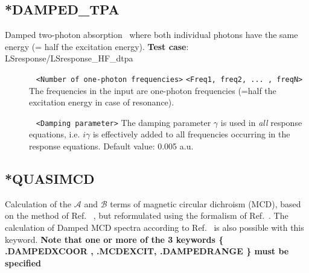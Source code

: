 \subsection{*DAMPED\_TPA}\label{subsec:dtpa}
Damped two-photon absorption~\cite{dampedtpa} where both individual photons
have the same energy (= half the excitation energy).
\newline
{\bf Test case}: LSresponse/LSresponse\_HF\_dtpa 
\begin{description}
\item[] \verb| | \newline
\verb|<Number of one-photon frequencies>|\newline
\verb|<Freq1, freq2, ... , freqN>|\newline
The frequencies in the input are one-photon frequencies (=half the
excitation energy in case of resonance).
\item[] \verb| | \newline
\verb|<Damping parameter>|\newline
The damping parameter $\gamma$ is used in \emph{all} response equations,
i.e. $i \gamma$ is effectively added to all frequencies occurring in the response equations.
Default value: 0.005 a.u.
\end{description}

\subsection{*QUASIMCD}\label{subsec:quasimcd}
Calculation of the  $\mathcal{A}$ and $\mathcal{B}$ terms of magnetic circular dichroism (MCD), based on the method of Ref.~ \cite{KjaergaardMCD}, but reformulated using the formalism of Ref.~\cite{thorvaldsen:214108}. 
The calculation of Damped MCD spectra according to Ref.~\cite{KjaergaardDampedMCD} is also possible with this keyword.
\newline
{\bf Note that one or more of the 3 keywords \{ .DAMPEDXCOOR  , .MCDEXCIT, .DAMPEDRANGE \} must be specified}

